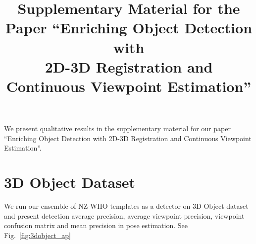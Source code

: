 \documentclass[10pt,twocolumn,letterpaper]{article}
\begin{document}
\title{Supplementary Material for the Paper ``Enriching Object Detection with\\2D-3D Registration and Continuous Viewpoint Estimation''}


\maketitle

We present qualitative results in the supplementary material for our paper ``Enriching Object Detection with 2D-3D Registration and Continuous Viewpoint Estimation''.

\section{3D Object Dataset}
\label{sect:3dobject}
We run our ensemble of NZ-WHO templates as a detector on 3D Object dataset\cite{savarese07} and present detection average precision, average viewpoint precision, viewpoint confusion matrix and mean precision in pose estimation. See Fig.~\ref{fig:3dobject_ap}
\end{document}
